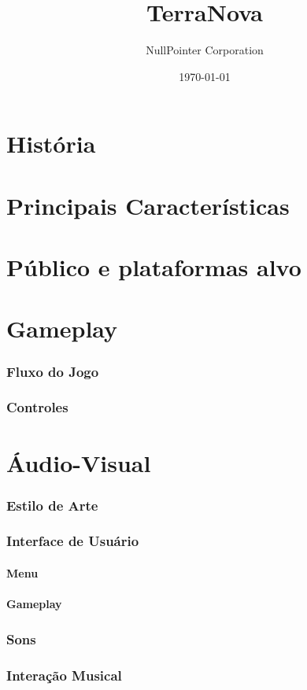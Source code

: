 \documentclass[11pt]{article}
\begin{document}
\title{TerraNova}
\author{NullPointer Corporation}
\date{\today}
\maketitle

\newpage
 
\begin{abstract}
\end{abstract}

\tableofcontents
 
\part{História}
 
\part{Principais Características}
 
\part{Público e plataformas alvo}

\part{Gameplay}
\section{Fluxo do Jogo}
 
\section{Controles}
 
\part{Áudio-Visual}
\section{Estilo de Arte}
 
\section{Interface de Usuário}
\subsection{Menu}
 
\subsection{Gameplay}
 
\section{Sons}
 
\section{Interação Musical}
 
\end{document}
